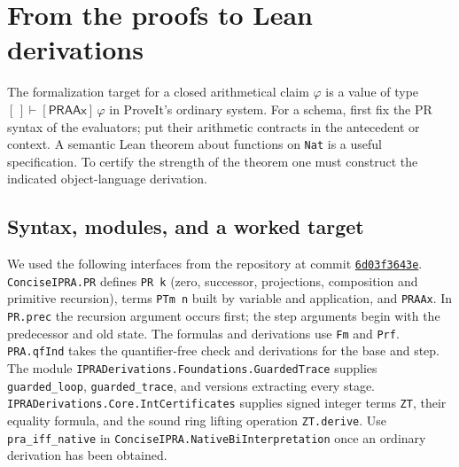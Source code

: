 \section{From the proofs to Lean derivations}\label{sec:formal}
The formalization target for a closed arithmetical claim $\varphi$ is a value of type $[\,]\vdash[\mathsf{PRAAx}]\,\varphi$ in ProveIt's ordinary system. For a schema, first fix the PR syntax of the evaluators; put their arithmetic contracts in the antecedent or context. A semantic Lean theorem about functions on \texttt{Nat} is a useful specification. To certify the strength of the theorem one must construct the indicated object-language derivation.

\subsection{Syntax, modules, and a worked target}
We used the following interfaces from the repository at commit
\href{https://github.com/VladimirReshetnikov/ProveIt/tree/6d03f3643ebb91a6243eb1e35e7599b388197786}{\texttt{6d03f3643e}}.
\texttt{ConciseIPRA.PR} defines \texttt{PR k} (zero, successor, projections, composition and primitive recursion), terms \texttt{PTm n} built by variable and application, and \texttt{PRAAx}. In \texttt{PR.prec} the recursion argument occurs first; the step arguments begin with the predecessor and old state. The formulas and derivations use \texttt{Fm} and \texttt{Prf}. \texttt{PRA.qfInd} takes the quantifier-free check and derivations for the base and step. The module \texttt{IPRADerivations.Foundations.GuardedTrace} supplies \texttt{guarded\_loop}, \texttt{guarded\_trace}, and versions extracting every stage. \texttt{IPRADerivations.Core.IntCertificates} supplies signed integer terms \texttt{ZT}, their equality formula, and the sound ring lifting operation \texttt{ZT.derive}. Use \texttt{pra\_iff\_native} in \texttt{ConciseIPRA.NativeBiInterpretation} once an ordinary derivation has been obtained.

